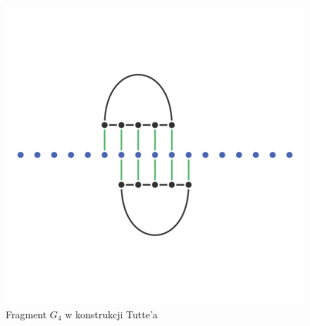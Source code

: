 \begin{figure}[H]
	\centering
	\includegraphics[scale=0.5]{images/tutte_graph.png}
	\caption{Fragment $G_4$ w konstrukcji Tutte'a}
\end{figure}

